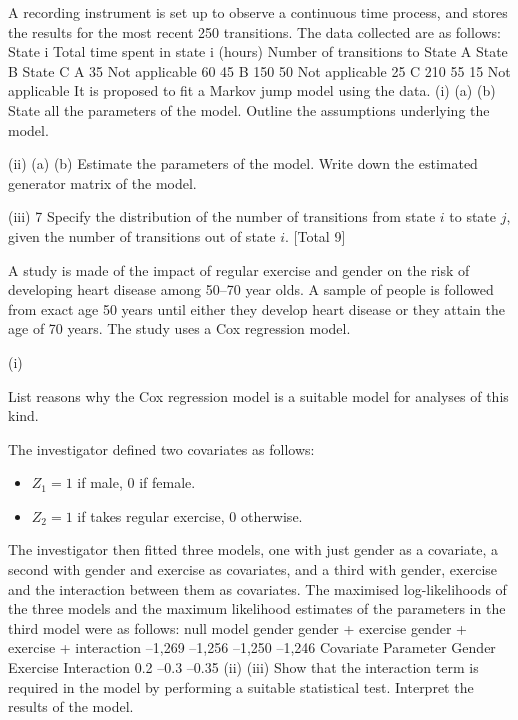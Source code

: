 \documentclass[a4paper,12pt]{article}
\begin{document}
\begin{enumerate}
A recording instrument is set up to observe a continuous time process, and stores the
results for the most recent 250 transitions. The data collected are as follows:
State
i Total time
spent in
state i
(hours)
Number of transitions to
State A
State B
State C
A 35 Not
applicable 60 45
B 150 50 Not
applicable 25
C 210 55 15 Not
applicable
It is proposed to fit a Markov jump model using the data.
(i)
(a)
(b)
State all the parameters of the model.
Outline the assumptions underlying the model.

(ii)
(a)
(b)
Estimate the parameters of the model.
Write down the estimated generator matrix of the model.

(iii)
7
Specify the distribution of the number of transitions from state $i$ to state $j$,
given the number of transitions out of state $i$.
[Total 9]
\newpage


A study is made of the impact of regular exercise and gender on the risk of developing heart disease among 50–70 year olds. A sample of people is followed from exact age 50 years until either they develop heart disease or they attain the age of 70
years. The study uses a Cox regression model.

(i)

List reasons why the Cox regression model is a suitable model for analyses of this kind.

The investigator defined two covariates as follows:

\begin{itemize}
\item $Z_1 = 1$ if male, 0 if female.
\item $Z_2 = 1$ if takes regular exercise, 0 otherwise.
\end{itemize} 

The investigator then fitted three models, one with just gender as a covariate, a second with gender and exercise as covariates, and a third with gender, exercise and the interaction between them as covariates. The maximised log-likelihoods of the three
models and the maximum likelihood estimates of the parameters in the third model
were as follows:
null model
gender
gender + exercise
gender + exercise + interaction –1,269
–1,256
–1,250
–1,246
Covariate Parameter
Gender
Exercise
Interaction 0.2
–0.3
–0.35
(ii)
(iii)
Show that the interaction term is required in the model by performing a
suitable statistical test.
Interpret the results of the model.




\end{enumerate}
\end{document}
